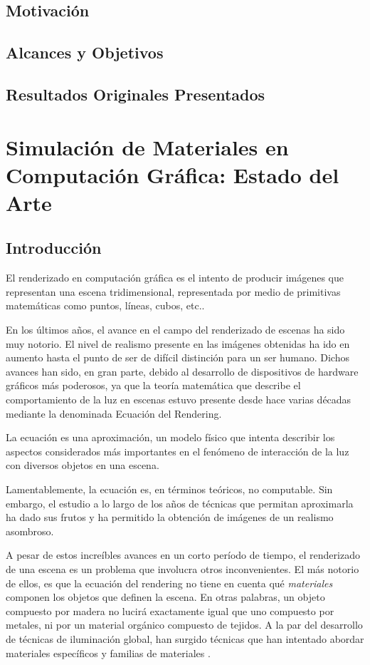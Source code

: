 \documentclass[spanish,a4paper,11pt,oneside,links]{report}
\begin{document}
\section{Motivación}
\section{Alcances y Objetivos}
\section{Resultados Originales Presentados}

\chapter{Simulación de Materiales en Computación Gráfica: Estado del Arte}
\section{Introducción} %
El renderizado en computación gráfica es el intento de producir imágenes que representan una escena tridimensional, representada por medio de primitivas matemáticas como puntos, líneas, cubos, etc..

En los últimos años, el avance en el campo del renderizado de escenas ha sido muy notorio. El nivel de realismo presente en las imágenes obtenidas ha ido en aumento hasta el punto de ser de difícil distinción para un ser humano. Dichos avances han sido, en gran parte, debido al desarrollo de dispositivos de hardware gráficos más poderosos, ya que la teoría matemática que describe el comportamiento de la luz en escenas estuvo presente desde hace varias décadas \cite{Kajiya} mediante la denominada Ecuación del Rendering.


La ecuación es una aproximación, un modelo físico que intenta describir los aspectos considerados más importantes en el fenómeno de interacción de la luz con diversos objetos en una escena.

Lamentablemente, la ecuación es, en términos teóricos, no computable. Sin embargo, el estudio a lo largo de los años de técnicas que permitan aproximarla ha dado sus frutos y ha permitido la obtención de imágenes de un realismo asombroso.

A pesar de estos increíbles avances en un corto período de tiempo, el renderizado de una escena es un problema que involucra otros inconvenientes. El más notorio de ellos, es que la ecuación del rendering no tiene en cuenta qué {\em materiales} componen los objetos que definen la escena. En otras palabras, un objeto compuesto por madera no lucirá exactamente igual que uno compuesto por metales, ni por un material orgánico compuesto de tejidos. A la par del desarrollo de técnicas de iluminación global, han surgido técnicas que han intentado abordar materiales específicos \cite{} y familias de materiales \cite{}.
\end{document}

